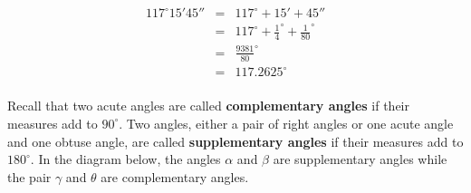 \documentclass{ximera}
\begin{document}
\[ \begin{array}{rcl}

 117^{\circ}15'45'' & = & 117^{\circ} + 15' + 45'' \\  
                    & = & 117^{\circ} + \frac{1}{4}^{\circ} + \frac{1}{80}^{\circ} \\  
                    & = & \frac{9381}{80}^{\circ} \\  
                    & = &  117.2625^{\circ} \\ \end{array} \]

Recall that two acute angles are called \textbf{complementary angles} if their measures add to $90^{\circ}$.  Two angles, either a pair of right angles or one acute angle and one obtuse angle, are called \textbf{supplementary angles} if their measures add to $180^{\circ}$. In the diagram below,  the angles $\alpha$ and $\beta$ are supplementary angles while the pair $\gamma$ and $\theta$ are complementary angles. 
\end{document}
